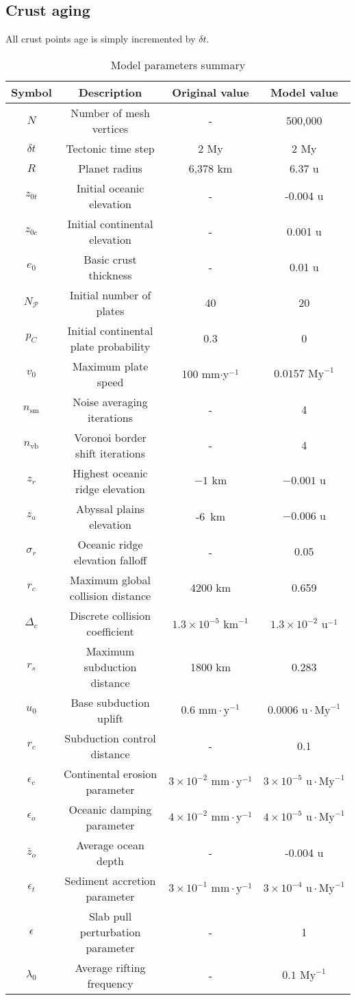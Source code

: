 \subsection{Crust aging}
All crust points age is simply incremented by $\delta t$.
\begin{table}[h]
\centering
\begin{tabular}{cccc}
\textbf{Symbol}&\textbf{Description}&\textbf{Original value}&\textbf{Model value}\\
\hline
$N$&Number of mesh vertices&-&500,000\\
$\delta t$&Tectonic time step&2 My&2 My\\
$R$&Planet radius&6,378 km&6.37 u\\
$z_{0t}$&Initial oceanic elevation&-&-0.004 u\\
$z_{0c}$&Initial continental elevation&-&0.001 u\\
$e_0$&Basic crust thickness&-&0.01 u\\
$N_\mathcal{P}$&Initial number of plates&40&20\\
$p_C$&Initial continental plate probability&0.3&0\\
$v_0$&Maximum plate speed&100 mm$\cdot$y$^{-1}$&$0.0157\mbox{ My}^{-1}$\\
$n_{\mbox{sm}}$&Noise averaging iterations&-&4\\
$n_{\mbox{vb}}$&Voronoi border shift iterations&-&4\\
$z_r$&Highest oceanic ridge elevation&$-1\mbox{ km}$&$-0.001\mbox{ u}$\\
$z_a$&Abyssal plains elevation&-6\mbox{ km}&$-0.006\mbox{ u}$\\
$\sigma_r$&Oceanic ridge elevation falloff&-&$0.05$\\
$r_c$&Maximum global collision distance&4200 km&0.659\\
$\Delta_c$&Discrete collision coefficient&$1.3\times10^{-5}\mbox{ km}^{-1}$&$1.3\times10^{-2}\mbox{ u}^{-1}$\\
$r_s$&Maximum subduction distance&1800 km&0.283\\
$u_0$&Base subduction uplift&$0.6\mbox{ mm}\cdot\mbox{y}^{-1}$&$0.0006\mbox{ u}\cdot\mbox{My}^{-1}$\\
$r_c$&Subduction control distance&-&0.1\\
$\epsilon_c$&Continental erosion parameter&$3\times10^{-2}\mbox{ mm}\cdot\mbox{y}^{-1}$&$3\times10^{-5}\mbox{ u}\cdot\mbox{My}^{-1}$\\
$\epsilon_o$&Oceanic damping parameter&$4\times10^{-2}\mbox{ mm}\cdot\mbox{y}^{-1}$&$4\times10^{-5}\mbox{ u}\cdot\mbox{My}^{-1}$\\
$\bar{z}_o$&Average ocean depth&-&-0.004 u\\
$\epsilon_t$&Sediment accretion parameter&$3\times10^{-1}\mbox{ mm}\cdot\mbox{y}^{-1}$&$3\times10^{-4}\mbox{ u}\cdot\mbox{My}^{-1}$\\
$\epsilon$&Slab pull perturbation parameter&-&1\\
$\lambda_0$&Average rifting frequency&-&$0.1\mbox{ My}^{-1}$\\
\end{tabular}
\caption{Model parameters summary}
\label{tab:model-parameters-summary}
\end{table}